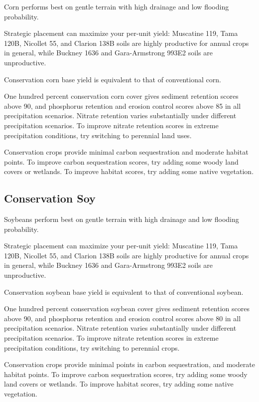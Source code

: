 \documentclass[11pt]{article}
\begin{document}
Corn performs best on gentle terrain with high drainage and low flooding probability.

Strategic placement can maximize your per-unit yield: Muscatine 119, Tama 120B, Nicollet 55, and Clarion 138B soils are highly productive for annual crops in general, while Buckney 1636 and Gara-Armstrong 993E2 soils are unproductive.

Conservation corn base yield is equivalent to that of conventional corn.

One hundred percent conservation corn cover gives sediment retention scores above 90, and phosphorus retention and erosion control scores above 85 in all precipitation scenarios. Nitrate retention varies substantially under different precipitation scenarios. To improve nitrate retention scores in extreme precipitation conditions, try switching to perennial land uses.

Conservation crops provide minimal carbon sequestration and moderate habitat points. To improve carbon sequestration scores, try adding some woody land covers or wetlands. To improve habitat scores, try adding some native vegetation.

\subsection{Conservation Soy}

Soybeans perform best on gentle terrain with high drainage and low flooding probability.

Strategic placement can maximize your per-unit yield: Muscatine 119, Tama 120B, Nicollet 55, and Clarion 138B soils are highly productive for annual crops in general, while Buckney 1636 and Gara-Armstrong 993E2 soils are unproductive.

Conservation soybean base yield is equivalent to that of conventional soybean.

One hundred percent conservation soybean cover gives sediment retention scores above 90, and phosphorus retention and erosion control scores above 80 in all precipitation scenarios. Nitrate retention varies substantially under different precipitation scenarios. To improve nitrate retention scores in extreme precipitation conditions, try switching to perennial crops.

Conservation crops provide minimal points in carbon sequestration, and moderate habitat points. To improve carbon sequestration scores, try adding some woody land covers or wetlands. To improve habitat scores, try adding some native vegetation.
\end{document}
